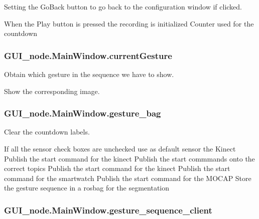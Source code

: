 Setting the Go\+Back button to go back to the configuration window if clicked. 

When the Play button is pressed the recording is initialized Counter used for the countdown 
\subsubsection[{\texorpdfstring{current\+Gesture}{currentGesture}}]{\setlength{\rightskip}{0pt plus 5cm}G\+U\+I\+\_\+node.\+Main\+Window.\+current\+Gesture}\hypertarget{classGUI__node_1_1MainWindow_aac86778a09138bea9fac784d6256f4cb}{}\label{classGUI__node_1_1MainWindow_aac86778a09138bea9fac784d6256f4cb}


Obtain which gesture in the sequence we have to show. 

Show the corresponding image. 
\subsubsection[{\texorpdfstring{gesture\+\_\+bag}{gesture_bag}}]{\setlength{\rightskip}{0pt plus 5cm}G\+U\+I\+\_\+node.\+Main\+Window.\+gesture\+\_\+bag}\hypertarget{classGUI__node_1_1MainWindow_a22d0b06dd28ab99da9a30e7559a3146f}{}\label{classGUI__node_1_1MainWindow_a22d0b06dd28ab99da9a30e7559a3146f}


Clear the countdown labels. 

If all the sensor check boxes are unchecked use as default sensor the Kinect Publish the start command for the kinect Publish the start commmands onto the correct topics Publish the start command for the kinect Publish the start command for the smartwatch Publish the start command for the M\+O\+C\+AP Store the gesture sequence in a rosbag for the segmentation 
\subsubsection[{\texorpdfstring{gesture\+\_\+sequence\+\_\+client}{gesture_sequence_client}}]{\setlength{\rightskip}{0pt plus 5cm}G\+U\+I\+\_\+node.\+Main\+Window.\+gesture\+\_\+sequence\+\_\+client}\hypertarget{classGUI__node_1_1MainWindow_a04c5542293c4d310ec05ac466b2caf09}{}\label{classGUI__node_1_1MainWindow_a04c5542293c4d310ec05ac466b2caf09}


